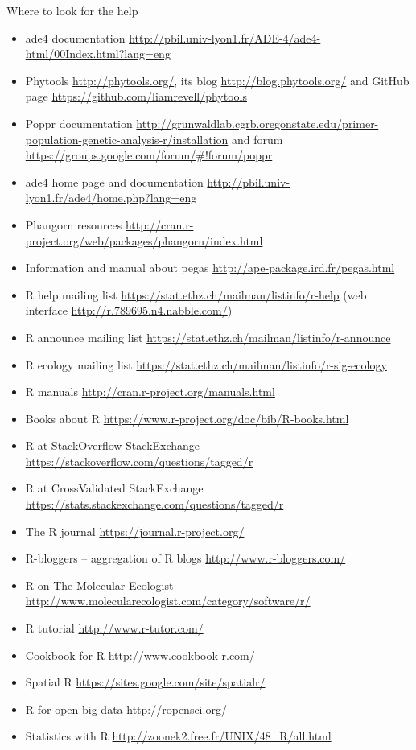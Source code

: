 \documentclass[compress, ucs, xelatex, 11pt, xcolor=svgnames,
  hyperref={
    bookmarks=true,
    unicode=true,
    colorlinks=true,
    pdftitle={Molecular data in R},
    plainpages=false,
    pdfauthor={Vojtech Zeisek},
    pdfsubject={Course about phylogeny and evolution in R},
    pdfcreator={XeLaTeX},
    pdfkeywords={R, evolution, phylogeny, molecular data},
    linkcolor=Tomato,
    anchorcolor=SaddleBrown,
    citecolor=Goldenrod,
    filecolor=DarkMagenta,
    menucolor=Sienna,
    urlcolor=DarkTurquoise,
    pdftex},
  url={hyphens, lowtilde} %
  ]{beamer}
\begin{document}
\begin{frame}[allowframebreaks]{Where to look for the help}
\begin{itemize}
 \item ade4 documentation \url{http://pbil.univ-lyon1.fr/ADE-4/ade4-html/00Index.html?lang=eng}
 \item Phytools \url{http://phytools.org/}, its blog \url{http://blog.phytools.org/} and GitHub page \url{https://github.com/liamrevell/phytools}
 \item Poppr documentation \url{http://grunwaldlab.cgrb.oregonstate.edu/primer-population-genetic-analysis-r/installation} and forum \url{https://groups.google.com/forum/\#!forum/poppr}
 \item ade4 home page and documentation \url{http://pbil.univ-lyon1.fr/ade4/home.php?lang=eng}
 \item Phangorn resources \url{http://cran.r-project.org/web/packages/phangorn/index.html}
 \item Information and manual about pegas \url{http://ape-package.ird.fr/pegas.html}
 \item R help mailing list \url{https://stat.ethz.ch/mailman/listinfo/r-help} (web interface \url{http://r.789695.n4.nabble.com/})
 \item R announce mailing list \url{https://stat.ethz.ch/mailman/listinfo/r-announce}
 \item R ecology mailing list \url{https://stat.ethz.ch/mailman/listinfo/r-sig-ecology}
 \item R manuals \url{http://cran.r-project.org/manuals.html}
 \item Books about R \url{https://www.r-project.org/doc/bib/R-books.html}
 \item R at StackOverflow StackExchange \url{https://stackoverflow.com/questions/tagged/r}
 \item R at CrossValidated StackExchange \url{https://stats.stackexchange.com/questions/tagged/r}
 \item The R journal \url{https://journal.r-project.org/}
 \item R-bloggers -- aggregation of R blogs \url{http://www.r-bloggers.com/}
 \item R on The Molecular Ecologist \url{http://www.molecularecologist.com/category/software/r/}
 \item R tutorial \url{http://www.r-tutor.com/}
 \item Cookbook for R  \url{http://www.cookbook-r.com/}
 \item Spatial R \url{https://sites.google.com/site/spatialr/}
 \item R for open big data \url{http://ropensci.org/}
 \item Statistics with R \url{http://zoonek2.free.fr/UNIX/48_R/all.html}

\end{itemize}
\end{frame}
\end{document}
